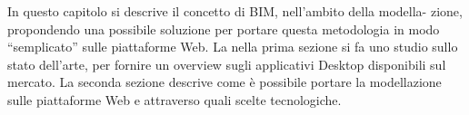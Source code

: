 In questo capitolo si descrive il concetto di BIM, nell’ambito della modella-
zione, propondendo una possibile soluzione per portare questa metodologia in modo ``semplicato'' sulle piattaforme Web.
La nella prima sezione si fa uno studio sullo stato dell’arte, per fornire un overview
sugli applicativi Desktop disponibili sul mercato. La seconda sezione descrive come è
possibile portare la modellazione sulle piattaforme Web e attraverso quali scelte tecnologiche.
